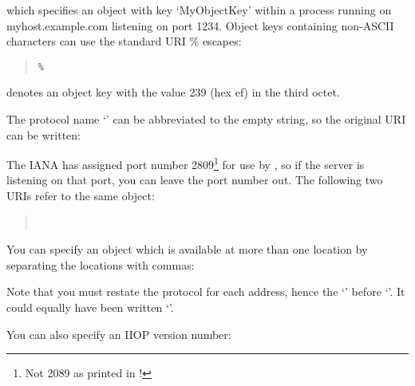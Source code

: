 \documentclass[11pt,oneside,a4paper]{book}
\begin{document}
\begin{quote}
\end{quote}

\noindent which specifies an object with key `MyObjectKey' within a
process running on myhost.example.com listening on port 1234. Object
keys containing non-ASCII characters can use the standard URI \%
escapes:

\begin{quote}
%
\texttt{\%}%
\end{quote}

\noindent denotes an object key with the value 239 (hex ef) in the
third octet.

The protocol name `' can be abbreviated to the empty
string, so the original URI can be written:

\begin{quote}
\end{quote}

\noindent The IANA has assigned port number 2809\footnote{Not 2089 as
printed in \cite{inschapters}!} for use by , so if
the server is listening on that port, you can leave the port number
out.  The following two URIs refer to the same object:

\begin{quote}
\\
\end{quote}

\noindent You can specify an object which is available at more than
one location by separating the locations with commas:

\begin{quote}
\end{quote}

\noindent Note that you must restate the protocol for each address,
hence the `\corbauri{:}' before `'. It could
equally have been written `'.

You can also specify an IIOP version number:

\begin{quote}
\end{quote}
\end{document}
